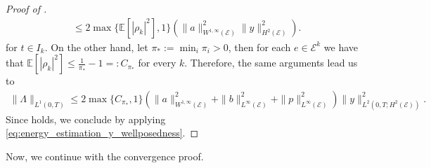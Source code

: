 \documentclass[a4paper, 10pt, english]{article}
\begin{document}
\begin{proof}[Proof of ]
\begin{align*}
    &\leq 2\max\{\mathbb{E}[|\rho_k|^2],1\}\left( \|a\|_{W^{1,\infty}(\mathcal{E})}^2\|y \|_{H^2(\mathcal{E})}^2\right).
\end{align*}
 for $t\in I_k$. On the other hand, let $\pi_\ast:=\min_i\pi_i>0$, then for each $e\in \mathcal{E}^k$ we have that $\mathbb{E}[|\rho_k|^2]\leq \frac{1}{\pi_\ast}-1 =:C_{\pi_\ast}$ for every $k$. Therefore, the same arguments lead us to
\begin{align*}
    \|\Lambda\|_{L^1(0,T)}\leq  2\max\{C_{\pi_\ast},1\}\left(\|a\|_{W^{1,\infty}(\mathcal{E})}^2+\|b\|_{L^{\infty}(\mathcal{E})}^2+\|p\|_{L^{\infty}(\mathcal{E})}^2\right)\|y\|^2_{L^2(0,T;H^2(\mathcal{E}))}.
\end{align*}
Since  holds, we conclude by applying \eqref{eq:energy_estimation_y_wellposedness}.
\end{proof}
Now, we continue with the convergence proof. 
\end{document}

